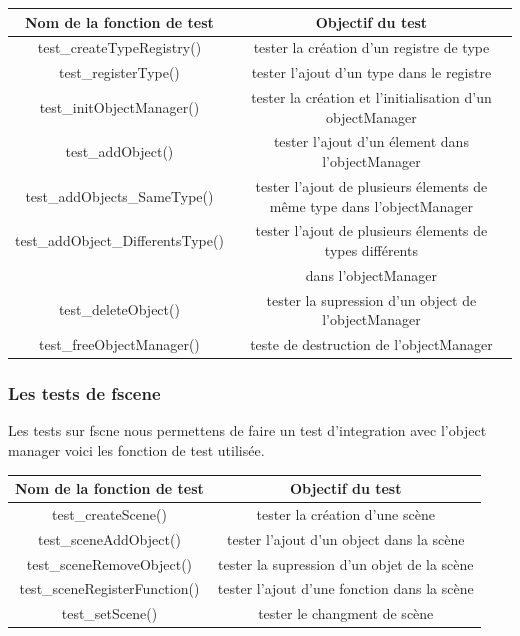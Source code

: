 \documentclass[a4paper,11pt]{article}
\begin{document}
\begin{table}[h]
\centering
\begin{tabular}{|c|c|}
\hline
\textbf{Nom de la fonction de test} & \textbf{Objectif du test}\\
\hline
test\_createTypeRegistry() & tester la création d'un registre de type \\
\hline
test\_registerType() & tester l'ajout d'un type dans le registre \\
\hline
test\_initObjectManager()& tester la création et l'initialisation d'un objectManager \\
\hline
test\_addObject()& tester l'ajout d'un élement dans l'objectManager \\
\hline
test\_addObjects\_SameType() & tester l'ajout de plusieurs élements de même type dans l'objectManager \\
\hline
test\_addObject\_DifferentsType() &  tester l'ajout de plusieurs élements de  types différents\\& dans l'objectManager\\
\hline
test\_deleteObject() & tester la supression d'un object de l'objectManager\\
\hline
test\_freeObjectManager() & teste de destruction de l'objectManager\\
\hline



\end{tabular}
\end{table}
\vspace{-5mm}
\bigskip
\subsubsection{Les tests de fscene}
Les tests sur fscne nous permettens de faire un test d'integration avec l'object manager voici les fonction de test utilisée.\\
\begin{table}[h]
\centering
\begin{tabular}{|c|c|}
\hline
\textbf{Nom de la fonction de test} & \textbf{Objectif du test}\\
\hline
test\_createScene() & tester la création d'une scène \\
\hline
test\_sceneAddObject() & tester l'ajout d'un object dans la scène \\
\hline
test\_sceneRemoveObject()& tester la supression d'un objet de la scène\\
\hline
test\_sceneRegisterFunction() & tester l'ajout d'une fonction dans la scène \\
\hline
test\_setScene()  & tester le changment de scène\\
\hline

\end{tabular}
\end{table}
\end{document}
